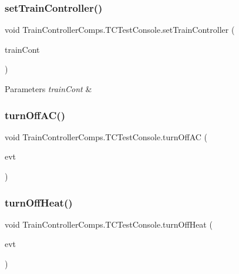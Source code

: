 \subsubsection{\texorpdfstring{set\+Train\+Controller()}{setTrainController()}}
{\footnotesize\ttfamily void Train\+Controller\+Comps.\+T\+C\+Test\+Console.\+set\+Train\+Controller (\begin{DoxyParamCaption}\item[{\hyperlink{classTrainControllerComps_1_1TrainController}{Train\+Controller}}]{train\+Cont }\end{DoxyParamCaption})\hspace{0.3cm}{\ttfamily [private]}}


\begin{DoxyParams}{Parameters}
{\em train\+Cont} & \\
\hline
\end{DoxyParams}
\mbox{\label{classTrainControllerComps_1_1TCTestConsole_a8350577198661578c091f8ae9f299ad4}} 
\subsubsection{\texorpdfstring{turn\+Off\+A\+C()}{turnOffAC()}}
{\footnotesize\ttfamily void Train\+Controller\+Comps.\+T\+C\+Test\+Console.\+turn\+Off\+AC (\begin{DoxyParamCaption}\item[{java.\+awt.\+event.\+Action\+Event}]{evt }\end{DoxyParamCaption})\hspace{0.3cm}{\ttfamily [private]}}

\mbox{\label{classTrainControllerComps_1_1TCTestConsole_a37a58178270fbb1e271fd6d71a32313b}} 
\subsubsection{\texorpdfstring{turn\+Off\+Heat()}{turnOffHeat()}}
{\footnotesize\ttfamily void Train\+Controller\+Comps.\+T\+C\+Test\+Console.\+turn\+Off\+Heat (\begin{DoxyParamCaption}\item[{java.\+awt.\+event.\+Action\+Event}]{evt }\end{DoxyParamCaption})\hspace{0.3cm}{\ttfamily [private]}}

